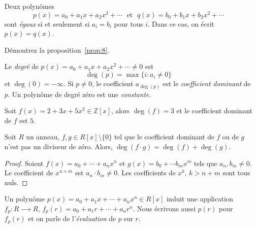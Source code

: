 \begin{proposition}
  \label{prop:8}
  Deux polynômes 
\begin{equation}
  \label{eq:34}
  p(x) = a_0 + a_1x + a_2x^2 + \cdots \,\,\text{ et }  \,\, q(x) = b_0 + b_1x + b_2x^2 + \cdots
\end{equation}
sont \emph{égaux} si et seulement si $a_i =b_i$ pour tous $i$. Dans ce
cas, on écrit $p(x) = q(x)$.
\end{proposition}

\begin{exercise}
  \label{exe:34}
  Démontrez  la proposition~\ref{prop:8}. 
\end{exercise}



\begin{definition}
  \label{def:52}
Le \emph{degré} de $p(x) = a_0 + a_1x + a_2x^2 + \cdots \neq 0$ est 
\begin{displaymath}
  \deg(p) = \max\{i \colon  a_i \neq 0\}
\end{displaymath}
et $\deg(0) = -\infty$. 
Si $p \neq 0$, le coefficient $a_{\deg(p)}$ est le \emph{coefficient dominant} de $p$. 
Un polynôme de degré zéro est une \emph{constante}.
\end{definition}

\begin{example}
  \label{exe:35}
  Soit $f(x) = 2 + 3x + 5x^3 ∈ ℤ[x]$, alors $\deg(f) =3$  et le coefficient dominant de $f$ est $5$. 
\end{example}

\begin{theorem}
  \label{thr:34} Soit $R$ un anneau,   $f,g \in R[x] \setminus \{0\}$ tel que le coefficient dominant de $f$ ou de $g$ n'est pas un diviseur de zéro.  Alors, $\deg(f \cdot g) = \deg(f) + \deg(g)$. 
\end{theorem}
\begin{proof}
  
  Soient $f(x) = a_0 + \cdots + a_n x^n$ et $g(x) = b_0+ \cdots b_m x^m$ tels que $a_n, b_m  \neq 0$. Le coefficient de $x^{n+m}$  est $a_n \cdot  b_m \neq 0$. Les coefficients de $x^k$, $k> n+m$ sont tous nuls.  
\end{proof}

Un polynôme $p(x) = a_0 + a_1 x + \cdots + a_n x^n ∈ R[x]$ induit une application $f_p:  R ⟶ R$, $f_p(r) = a_0+ a_1 r+ \cdots + a_n r^n$. Nous écrivons aussi $p(r)$ pour $f_p(r)$ et on parle de l'\emph{évaluation} de $p$ sur $r$. 

